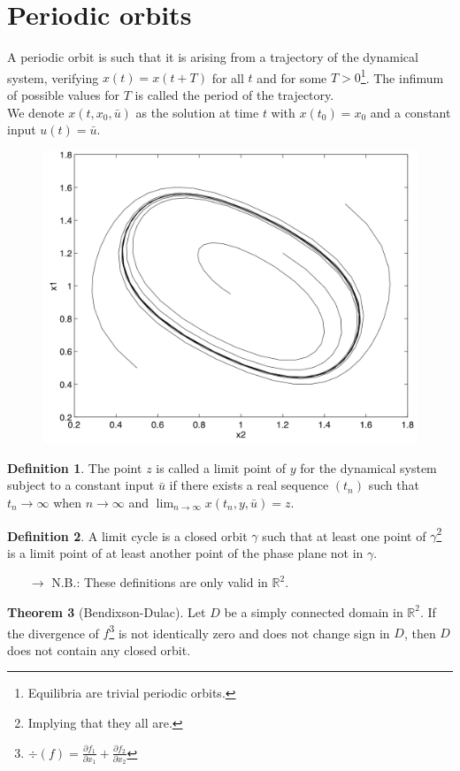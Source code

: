 \documentclass[12pt, openany]{report}
\theoremstyle{definition}
\newtheorem{thm}{Theorem}[chapter]
\newtheorem{definition}[thm]{Definition}
\newcommand{\R}{\mathbb{R}}
\begin{document}
\section{Periodic orbits}
A periodic orbit is such that it is arising from a trajectory of the dynamical system, verifying \(x(t)=x(t+T)\) for all \(t\) and for some \(T>0\)\footnote{Equilibria are trivial periodic orbits.}. The infimum of possible values for \(T\) is called the period of the trajectory.\\
We denote \(x(t,x_0,\bar u)\) as the solution at time \(t\) with \(x(t_0)=x_0\) and a constant input \(u(t) = \bar u\).
\begin{figure}[H]
    \centering
    \includegraphics[width = .5\textwidth]{img/limit_cycle.png}
\end{figure}
\begin{definition}
    The point \(z\) is called a limit point of \(y\) for the dynamical system subject to a constant input \(\bar u\) if there exists a real sequence \((t_n)\) such that \(t_n\rightarrow\infty\) when \(n\rightarrow \infty\) and \(\lim_{n\rightarrow\infty}x(t_n,y,\bar u)=z\).
\end{definition}
\begin{definition}
    A limit cycle is a closed orbit \(\gamma\) such that at least one point of \(\gamma\)\footnote{Implying that they all are.} is a limit point of at least another point of the phase plane not in \(\gamma\).
\end{definition}
\begin{itemize}
    \item [\(\rightarrow\)] N.B.: These definitions are only valid in \(\R^2\).
\end{itemize}
\begin{thm}[Bendixson-Dulac]
    Let \(D\) be a simply connected domain in \(\R^2\). If the divergence of \(f\)\footnote{\(\div(f) = \frac{\partial f_1}{\partial x_1}+\frac{\partial f_2}{\partial x_2}\)} is not identically zero and does not change sign in \(D\), then \(D\) does not contain any closed orbit. 
\end{thm}
\end{document}

